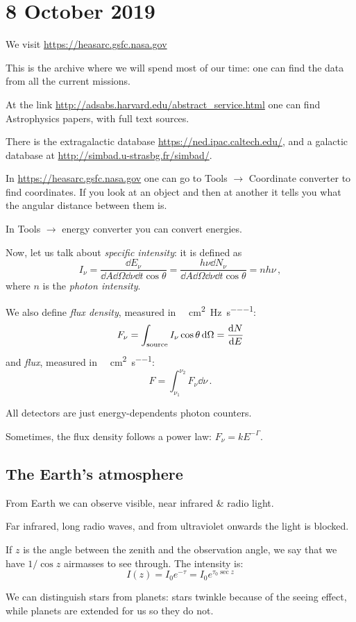 \documentclass[main.tex]{subfiles}
\begin{document}
\section*{8 October 2019}

We visit \url{https://heasarc.gsfc.nasa.gov}

This is the archive where we will spend most of our time: one can find the data from all the current missions.

At the link \url{http://adsabs.harvard.edu/abstract_service.html} one can find Astrophysics papers, with full text sources.

There is the extragalactic database \url{https://ned.ipac.caltech.edu/}, and a galactic database at \url{http://simbad.u-strasbg.fr/simbad/}.

In \url{https://heasarc.gsfc.nasa.gov} one can go to Tools \(\rightarrow\) Coordinate converter to find coordinates.
If you look at an object and then at another it tells you what the angular distance between them is.

In Tools \(\rightarrow\) energy converter you can convert energies.

Now, let us talk about \emph{specific intensity}:
it is defined as
%
\begin{equation}
  I_\nu = \frac{\dd{E_\nu}}{\dd{A} \dd{\Omega} \dd{\nu} \dd{t} \cos \theta}
  = \frac{h\nu\dd{N_\nu}}{\dd{A} \dd{\Omega} \dd{\nu} \dd{t} \cos \theta}
  = nh\nu\,,
\end{equation}
%
where \(n\) is the \emph{photon intensity}.

We also define \emph{flux density}, measured in \SI{}{\erg\per\square\centi\meter\per\hertz\per\second}:
%
\begin{equation}
  F_\nu = \int_{\text{source}} I_\nu \cos \theta \dd{\Omega} = \dv{N}{E}
\end{equation}
%
and \emph{flux}, measured in \SI{}{\erg\per\square\centi\meter\per\second}:
%
\begin{equation}
  F = \int_{\nu_1}^{\nu_2} F_\nu \dd{\nu}\,.
\end{equation}

All detectors are just energy-dependents photon counters.

Sometimes, the flux density follows a power law: \(F_\nu = k E^{-\Gamma}\).

\subsection{The Earth's atmosphere}

From Earth we can observe visible, near infrared \& radio light.

Far infrared, long radio waves, and from ultraviolet onwards the light is blocked.

If \(z\) is the angle between the zenith and the observation angle, we say that we have \(1 / \cos z \) airmasses to see through.
The intensity is:
%
\begin{equation}
  I(z) = I_0 e^{-\tau} = I_0 e^{\tau_0 \sec z}
\end{equation}

We can distinguish stars from planets: stars twinkle because of the seeing effect, while planets are extended for us so they do not.
\end{document}
